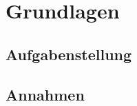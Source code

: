 \section{Grundlagen}
\label{sec:Grundlagen}

\subsection{Aufgabenstellung}
\label{subsec:Aufgabenstellung}

\subsection{Annahmen}
\label{subsec:Annahmen}

